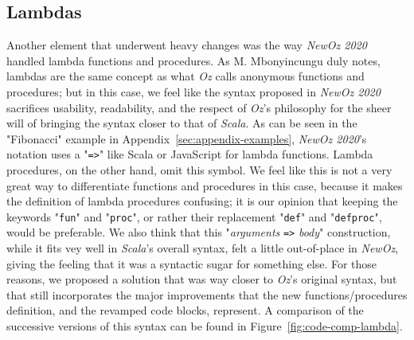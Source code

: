 \subsection{Lambdas}
Another element that underwent heavy changes was the way \textit{NewOz 2020} handled lambda functions and procedures.
As M. Mbonyincungu duly notes, lambdas are the same concept as what \textit{Oz} calls anonymous functions and procedures;
but in this case, we feel like the syntax proposed in \textit{NewOz 2020} sacrifices usability, readability, and the respect of \textit{Oz}'s philosophy for the sheer will of bringing the syntax closer to that of \textit{Scala}.
As can be seen in the "Fibonacci" example in Appendix~\ref{sec:appendix-examples}, \textit{NewOz 2020}'s notation uses a "\texttt{=>}" like Scala or JavaScript for lambda functions.
Lambda procedures, on the other hand, omit this symbol.
We feel like this is not a very great way to differentiate functions and procedures in this case, because it makes the definition of lambda procedures confusing;
it is our opinion that keeping the keywords "\texttt{fun}" and "\texttt{proc}", or rather their replacement "\texttt{def}" and "\texttt{defproc}", would be preferable.\newline
We also think that this "\textit{arguments} \texttt{=>} \textit{body}" construction, while it fits vey well in \textit{Scala}'s overall syntax, felt a little out-of-place in \textit{NewOz}, giving the feeling that it was a syntactic sugar for something else.
For those reasons, we proposed a solution that was way closer to \textit{Oz}'s original syntax, but that still incorporates the major improvements that the new functions/procedures definition, and the revamped code blocks, represent.
A comparison of the successive versions of this syntax can be found in Figure~\ref{fig:code-comp-lambda}.
